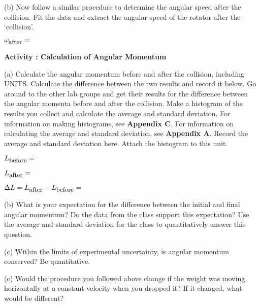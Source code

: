 \vspace{5mm}

\newpage

(b) Now follow a similar procedure to determine the angular speed after the collision.
Fit the data and extract the angular speed of the rotator after the `collision'.

\( \omega _{\mbox{\small after}}=\)

\vspace{20mm}

\textbf{Activity  : Calculation of Angular Momentum}

(a) Calculate the angular momentum before and after the collision, including UNITS. Calculate the difference between the two results and record it below. 
Go around to the other lab groups and get their results for the difference between the angular momenta before and after the collision.
Make a histogram of the results you collect and calculate the average and standard deviation.
For information on making histograms, see \textbf{Appendix C}. For information on calculating the average and
standard deviation, see \textbf{Appendix A}. Record the average and standard deviation here.
Attach the histogram to this unit.
\vspace{5mm}

\( L_{\mbox{\small before}}= \)  
\vspace{5mm}

\( L_{\mbox{\small after}}= \)
\vspace{5mm}

\( \Delta L= L_{\mbox{\small after}} - L_{\mbox{\small before}} = \)  
\vspace{30mm}

(b) What is your expectation for the difference between the initial and final angular momentum?
Do the data from the class support this expectation? 
Use the average and standard deviation for the class to quantitatively answer this question.
\vspace{20mm}


(c) Within the limits of experimental uncertainty, is angular momentum 
conserved?  Be quantitative.
\vspace{20mm}

(c) Would the procedure you followed above change if the weight was moving horizontally at a constant velocity when you dropped it? 
If it changed, what would be different?
\vspace{20mm}

